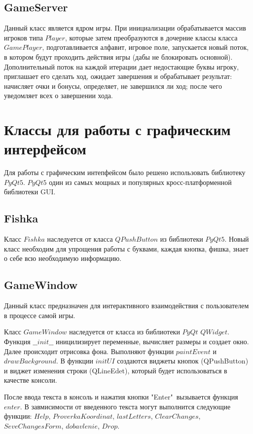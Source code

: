 \documentclass[a4paper,14pt]{article}
\begin{document}
	\subsection{GameServer}
	Данный класс является ядром игры. При инициализации обрабатывается массив игроков типа $Player$, которые затем преобразуются в дочерние классы класса $GamePlayer$, подготавливается алфавит, игровое поле, запускается новый поток, в котором будут проходить действия игры (дабы не блокировать основной). Дополнительный поток на каждой итерации дает недостающие буквы игроку, приглашает его сделать ход, ожидает завершения и обрабатывает результат: начисляет очки и бонусы, определяет, не завершился ли ход; после чего уведомляет всех о завершении хода.

	
\section{Классы для работы с графическим интерфейсом}
Для работы с графическим интепфейсом было решено использовать библиотеку $PyQt5$. $PyQt5$ один из самых мощных и популярных кросс-платформенной библиотеки GUI.
	\subsection{Fishka}
	Класс $Fishka$ наследуется от класса $QPushButton$ из библиотеки $PyQt5$. Новый класс необходим для упрощения работы с буквами, каждая кнопка, фишка, знает о себе всю необходимую информацию.
	\subsection{GameWindow}
	Данный класс предназначен для интерактивного взаимодействия с пользователем в процессе самой игры.
	
	Класс $GameWindow$ наследуется от класса из библиотеки $PyQt$ $QWidget$.	
	Функция $\_\_init\_\_$  иницилизирует переменные, вычисляет размеры и создает окно.	
	Далее происходит отрисовка фона. Выполняют функции $paintEvent$ и $drawBackground$.	
	В функции $initUI$ создаются виджеты кнопок (QPushButton) и виджет изменения строки (QLineEdet), который будет использоваться в качестве консоли.
		
	После ввода текста в консоль и нажатия кнопки "Enter"\ вызывается функция $enter$.
	В завмисимости от введенного текста могут выполнится следующие функции: $Help$, $ProverkaKoordinat$,  $lastLetters$,  $ClearChanges$, $SeveChangesForm$, $dobavlenie$, $Drop$.
	
\end{document}
